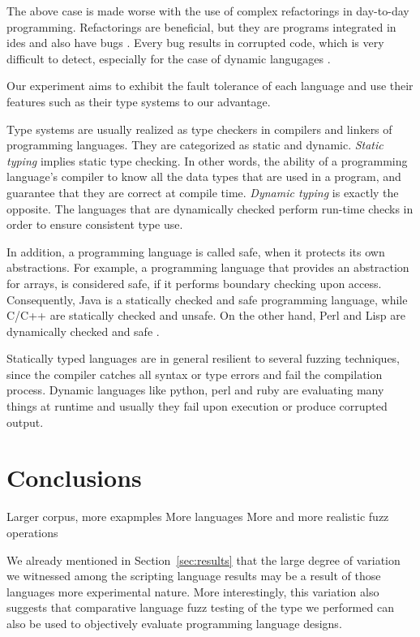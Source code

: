 \documentclass[10pt]{sigplanconf}
\begin{document}
The above case is made worse with the use of complex refactorings \cite{Fow00} in day-to-day programming. Refactorings are beneficial, but they are programs integrated in {\sc ide}s and also have bugs \cite{DDGM07}. Every bug results in corrupted code, which is very difficult to detect, especially for the case of dynamic langugages \cite{SCHA12,FFM11}.

Our experiment aims to exhibit the fault tolerance \cite{LYU95,KOKR07} of each language and use their features such as 
their type systems to our advantage. 

Type systems are usually realized as type checkers in compilers and linkers of programming languages. They are categorized as static and dynamic. \textit{Static typing} implies static type checking. In other words, the ability of a programming language's compiler to know all the data types that are used in a program, and guarantee that they are correct at compile time. \textit{Dynamic typing} is exactly the opposite. The languages that are dynamically checked perform run-time checks in order to ensure consistent type use. 

In addition, a programming language is called safe, when it protects its own abstractions. For example, a programming language that provides an abstraction for arrays, is considered safe, if it performs boundary checking upon access. Consequently, Java is a statically checked and safe programming language, while C/C++ are statically checked and unsafe. On the other hand, Perl and Lisp are dynamically checked and safe \cite{Pie02}.

Statically typed languages are in general resilient to several fuzzing techniques, since the compiler catches all syntax or type errors and fail the compilation process. Dynamic languages like python, perl and ruby are evaluating many things at runtime and usually they fail upon execution or produce corrupted output.

\section{Conclusions} %
\label{sec:conclusions}

Larger corpus,
more exapmples
More languages
More and more realistic fuzz operations


We already mentioned in Section~\ref{sec:results} that the
large degree of variation we witnessed among the scripting
language results may be a result of those languages
more experimental nature.
More interestingly, this variation also suggests that
comparative language fuzz testing of the type we performed
can also be used to objectively evaluate programming language
designs.
\end{document}
